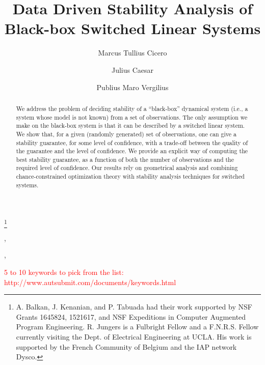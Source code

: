 \documentclass[twocolumn]{autart}
\begin{document}
\begin{frontmatter}
\title{Data Driven Stability Analysis of Black-box Switched Linear Systems}

\thanks[footnoteinfo]{A. Balkan, J. Kenanian, and P. Tabuada had their work supported by NSF Grants 1645824, 1521617, and NSF Expeditions in Computer Augmented Program Engineering. R. Jungers is a Fulbright Fellow and a F.N.R.S. Fellow currently visiting the Dept. of Electrical Engineering at UCLA. His work is supported by the French Community of Belgium and the IAP network Dysco.}

\author[UCLA]{Marcus Tullius Cicero},    %
\author[UCLA]{Julius Caesar},               %
\author[Louvain]{Publius Maro Vergilius}  %

\address[UCLA]{Department of Electrical Engineering at University of California, Los Angeles (UCLA)}  %
\address[Louvain]{UC Louvain/Raphael's affiliation}             %



\begin{keyword}                           %
\textcolor{red}{5 to 10 keywords to pick from the list: http://www.autsubmit.com/documents/keywords.html}   %
\end{keyword}                             %

\begin{abstract}
We address the problem of deciding stability of a ``black-box'' dynamical system (i.e., a system whose model is not known) from a set of observations. The only assumption we make on the black-box system is that it can be described by a switched linear system. We show that, for a given (randomly generated) set of observations, one can give a stability guarantee, for some level of confidence, with a trade-off between the quality of the guarantee and the level of confidence. We provide an explicit way of computing the best stability guarantee, as a function of both the number of observations and the required level of confidence. Our results rely on geometrical analysis and combining chance-constrained optimization theory with stability analysis techniques for switched systems.
\end{abstract}
\end{frontmatter}
\end{document}
